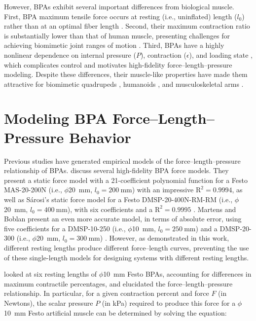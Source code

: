 However, BPAs exhibit several important differences from biological muscle. First, BPA maximum tensile force occurs at resting (i.e., uninflated) length ($l_0$) rather than at an optimal fiber length \citep{liang_comparative_2020}. Second, their maximum contraction ratio is substantially lower than that of human muscle, presenting challenges for achieving biomimetic joint ranges of motion \citep{hunt_modeling_2017, sarosi_comparative_2017, liang_comparative_2020}. Third, BPAs have a highly nonlinear dependence on internal pressure ($P$), contraction ($\epsilon$), and loading state \citep{hunt_modeling_2017, martens_modeling_2017}, which complicates control and motivates high-fidelity force--length--pressure modeling. Despite these differences, their muscle-like properties have made them attractive for biomimetic quadrupeds \citep{aschenbeck_design_2006, scharzenberger_design_2019}, humanoids \citep{asano_design_2017, hitzmann_anthropomorphic_2018}, and musculoskeletal arms \citep{kurumaya_musculoskeletal_2016, chen_realizing_2019}.

\section{Modeling BPA Force--Length--Pressure Behavior}\label{sec:bg_bpamodels}

Previous studies have generated empirical models of the force--length--pressure relationship of BPAs. \citet{sarosi_comparative_2017} discuss several high-fidelity BPA force models. They present a static force model with a 21-coefficient polynomial function for a Festo MAS-20-200N (i.e., $\phi$\qty{20}{\mm}, $l_0=\qty{200}{\mm}$) with an impressive $\text{R}^2=0.9994$, as well as S\'arosi's static force model for a Festo DMSP-20-400N-RM-RM (i.e., $\phi$\qty{20}{\mm}, $l_0=\qty{400}{\mm}$), with six coefficients and a $\text{R}^2=0.9995$ \citep{sarosi_new_2012, sarosi_investigation_2013}. Martens and Boblan present an even more accurate model, in terms of absolute error, using five coefficients for a DMSP-10-250 (i.e., $\phi$\qty{10}{\mm}, $l_0=\qty{250}{\mm}$) and a DMSP-20-300 (i.e., $\phi$\qty{20}{\mm}, $l_0=\qty{300}{\mm}$) \citep{martens_modeling_2017}. However, as demonstrated in this work, different resting lengths produce different force--length curves, preventing the use of these single-length models for designing systems with different resting lengths.

\citet{hunt_modeling_2017} looked at six resting lengths of $\phi$\qty{10}{\mm} Festo BPAs, accounting for differences in maximum contractile percentages, and elucidated the force--length--pressure relationship. In particular, for a given contraction percent and force $F$ (in Newtons), the scalar pressure $P$ (in kPa) required to produce this force for a $\phi$\qty{10}{\mm} Festo artificial muscle can be determined by solving the equation:

